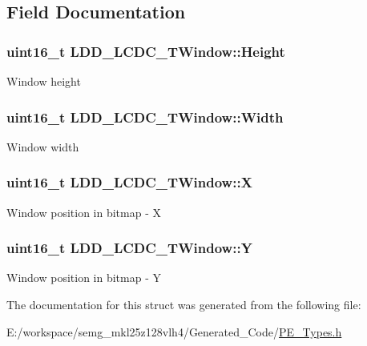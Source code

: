 \subsection{Field Documentation}
\hypertarget{struct_l_d_d___l_c_d_c___t_window_abe1dbefb6d43373336fa414b88a79cc2}{
\subsubsection[{Height}]{\setlength{\rightskip}{0pt plus 5cm}uint16\-\_\-t L\-D\-D\-\_\-\-L\-C\-D\-C\-\_\-\-T\-Window\-::\-Height}}\label{struct_l_d_d___l_c_d_c___t_window_abe1dbefb6d43373336fa414b88a79cc2}
Window height \hypertarget{struct_l_d_d___l_c_d_c___t_window_a53ee53813f5884a400be8ca3093233c4}{
\subsubsection[{Width}]{\setlength{\rightskip}{0pt plus 5cm}uint16\-\_\-t L\-D\-D\-\_\-\-L\-C\-D\-C\-\_\-\-T\-Window\-::\-Width}}\label{struct_l_d_d___l_c_d_c___t_window_a53ee53813f5884a400be8ca3093233c4}
Window width \hypertarget{struct_l_d_d___l_c_d_c___t_window_a9dd1270e9794b4dbd79b2b30afca87c9}{
\subsubsection[{X}]{\setlength{\rightskip}{0pt plus 5cm}uint16\-\_\-t L\-D\-D\-\_\-\-L\-C\-D\-C\-\_\-\-T\-Window\-::\-X}}\label{struct_l_d_d___l_c_d_c___t_window_a9dd1270e9794b4dbd79b2b30afca87c9}
Window position in bitmap -\/ X \hypertarget{struct_l_d_d___l_c_d_c___t_window_af64f532d1fb5899c563ba40df90867d8}{
\subsubsection[{Y}]{\setlength{\rightskip}{0pt plus 5cm}uint16\-\_\-t L\-D\-D\-\_\-\-L\-C\-D\-C\-\_\-\-T\-Window\-::\-Y}}\label{struct_l_d_d___l_c_d_c___t_window_af64f532d1fb5899c563ba40df90867d8}
Window position in bitmap -\/ Y 

The documentation for this struct was generated from the following file\-:\begin{DoxyCompactItemize}
\item 
E\-:/workspace/semg\-\_\-mkl25z128vlh4/\-Generated\-\_\-\-Code/\hyperlink{_p_e___types_8h}{P\-E\-\_\-\-Types.\-h}\end{DoxyCompactItemize}
